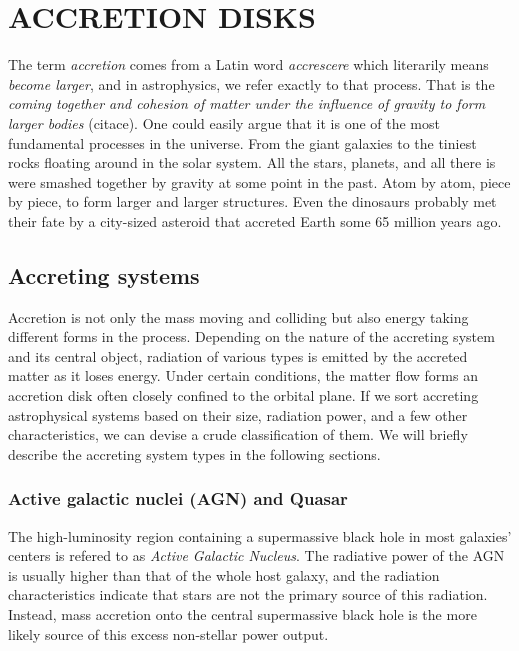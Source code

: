 \chapter{ACCRETION DISKS}
    \label{chap:accretion_disks}
    \thispagestyle{empty}


    The term \emph{accretion} comes from a Latin word \emph{accrescere} which literarily means \emph{become larger}, and in astrophysics, we refer exactly to that process. That is the \emph{coming together and cohesion of matter under the influence of gravity to form larger bodies} (citace). One could easily argue that it is one of the most fundamental processes in the universe. From the giant galaxies to the tiniest rocks floating around in the solar system. All the stars, planets, and all there is were smashed together by gravity at some point in the past. Atom by atom, piece by piece, to form larger and larger structures. Even the dinosaurs probably met their fate by a city-sized asteroid that accreted Earth some 65 million years ago. 

\section{Accreting systems}
    Accretion is not only the mass moving and colliding but also energy taking different forms in the process. Depending on the nature of the accreting system and its central object, radiation of various types is emitted by the accreted matter as it loses energy. Under certain conditions, the matter flow forms an accretion disk often closely confined to the orbital plane. If we sort accreting astrophysical systems based on their size, radiation power, and a few other characteristics, we can devise a crude classification of them. We will briefly describe the accreting system types in the following sections. 

\subsection{Active galactic nuclei (AGN) and Quasar}
    The high-luminosity region containing a supermassive black hole in most galaxies' centers is refered to as \emph{Active Galactic Nucleus}. The radiative power of the AGN is usually higher than that of the whole host galaxy, and the radiation characteristics indicate that stars are not the primary source of this radiation. Instead, mass accretion onto the central supermassive black hole is the more likely source of this excess non-stellar power output. 

